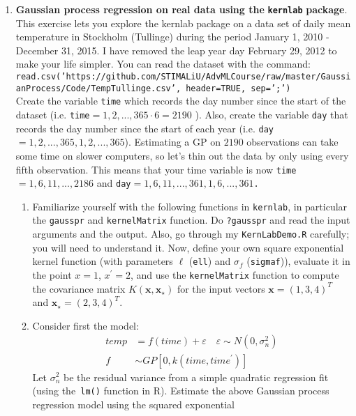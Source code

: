 \documentclass[11pt,english]{article}\usepackage[]{graphicx}\usepackage[]{color}
\begin{document}
\begin{enumerate}
\begin{enumerate}
\begin{table}
\end{table}
\end{enumerate}
\item \textbf{Gaussian process regression on real data using the }\texttt{\textbf{kernlab}}\textbf{
package}. This exercise lets you explore the kernlab package on a
data set of daily mean temperature in Stockholm (Tullinge) during
the period January 1, 2010 - December 31, 2015. I have removed the
leap year day February 29, 2012 to make your life simpler. You can
read the dataset with the command: \\
\texttt{\scriptsize{}read.csv('https://github.com/STIMALiU/AdvMLCourse/raw/master/GaussianProcess/Code/TempTullinge.csv',
header=TRUE, sep=';')}\\
Create the variable \texttt{time} which records the day number since
the start of the dataset (i.e. \texttt{time}$=1,2,...,365\cdot6=2190$
). Also, create the variable \texttt{day} that records the day number
since the start of each year (i.e. \texttt{day}$=1,2,...,365,1,2,...,365$).
Estimating a GP on $2190$ observations can take some time on slower
computers, so let's thin out the data by only using every fifth observation.
This means that your time variable is now \texttt{time}$=1,6,11,...,2186$
and \texttt{day$=1,6,11,...,361,1,6,...,361$.}
\begin{enumerate}
\item Familiarize yourself with the following functions in \texttt{kernlab},
in particular the \texttt{gausspr} and \texttt{kernelMatrix} function.
Do \texttt{?gausspr} and read the input arguments and the output.
Also, go through my \texttt{KernLabDemo.R} carefully; you will need
to understand it. Now, define your own square exponential kernel function
(with parameters $\ell$ (\texttt{ell}) and $\sigma_{f}$ (\texttt{sigmaf})),
evaluate it in the point $x=1$, $x^{\prime}=2$, and use the \texttt{kernelMatrix}
function to compute the covariance matrix $K(\mathbf{x},\mathbf{x}_{\star})$
for the input vectors $\mathbf{x}=(1,3,4)^{T}$ and $\mathbf{x}_{\star}=(2,3,4)^{T}$.
\item Consider first the model:
\begin{align*}
temp & =f(time)+\varepsilon\quad\varepsilon\sim N(0,\sigma_{n}^{2})\\
f & \sim GP\left[0,k(time,time^{\prime})\right]
\end{align*}
Let $\sigma_{n}^{2}$ be the residual variance from a simple quadratic
regression fit (using the\texttt{ lm()} function in R). Estimate the
above Gaussian process regression model using the squared exponential

\end{enumerate}
\end{enumerate}
\end{document}
